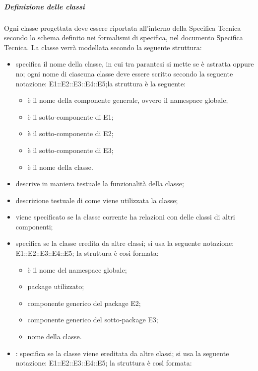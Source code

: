 \subparagraph{Definizione delle classi}

Ogni classe progettata deve essere riportata all'interno della Specifica Tecnica secondo lo schema definito nei formalismi di specifica, nel documento Specifica Tecnica. La classe verrà modellata secondo la seguente struttura:
\begin{itemize}
\item {}specifica il nome della classe, in cui tra parantesi si mette se è astratta oppure no; ogni nome di ciascuna classe deve essere scritto secondo la seguente notazione: E1::E2::E3::E4::E5;la struttura è la seguente:
\begin{itemize}
\item {}è il nome della componente generale, ovvero il namespace globale;
\item {}è il sotto-componente di E1;
\item {}è il sotto-componente di E2;
\item {}è il sotto-componente di E3;
\item {}è il nome della classe.
\end{itemize}
\item {}descrive in maniera testuale la funzionalità della classe;
\item {}descrizione testuale di come viene utilizzata la classe;
\item {}viene specificato se la classe corrente ha relazioni con delle classi di altri componenti;
\item {}specifica se la classe eredita da altre classi; si usa la seguente notazione: E1::E2::E3::E4::E5; la struttura è così formata:
\begin{itemize}
\item {}è il nome del namespace globale;
\item {}package utilizzato;
\item {}componente generico del package E2;
\item {}componente generico del sotto-package E3;
\item {}nome della classe.
\end{itemize}
\item {}: specifica se la classe viene ereditata da altre classi; si usa la seguente notazione: E1::E2::E3::E4::E5; la struttura è così formata:

\end{itemize}
